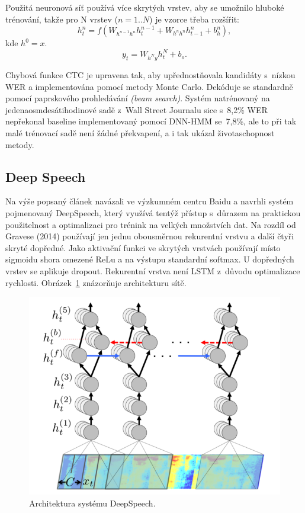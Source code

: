 Použitá neuronová síť používá více skrytých vrstev, aby se umožnilo hluboké
trénování, takže pro N vrstev ($n = 1 .. N$) je vzorce třeba rozšířit:
\begin{equation}
h_t^n = f(W_{h^{n-1}h^n}h_t^{n-1} + W_{h^{n}h^{n}}h_{t-1}^n + b_h^n),
\end{equation}
kde $h^0 = x$.
\begin{equation}
y_t = W_{h^{N}y}h_t^N + b_o.
\end{equation}

Chybová funkce CTC je upravena tak, aby upřednostňovala kandidáty s~nízkou WER a
implementována pomocí metody Monte Carlo. Dekóduje se standardně pomocí
paprskového prohledávání \textit{(beam search)}. Systém natrénovaný na
jedenaosmdesátihodinové sadě z~Wall Street Journalu sice s~8,2\% WER nepřekonal
baseline implementovaný pomocí DNN-HMM se~7,8\%, ale to při tak malé trénovací
sadě není žádné překvapení, a i tak ukázal životaschopnost metody.

\subsection{Deep Speech}
\label{ssec:deepspeechpaper}

Na výše popsaný článek navázali ve výzkumném centru Baidu a navrhli systém
pojmenovaný DeepSpeech\cite{hannun2014deep}, který využívá tentýž přístup
s~důrazem na praktickou použitelnost a optimalizaci pro trénink na velkých
množstvích dat. Na rozdíl od Gravese (2014) používají jen jednu obousměrnou
rekurentní vrstvu a další čtyři skryté dopředné. Jako aktivační funkci ve
skrytých vrstvách používají místo sigmoidu shora omezené ReLu a na výstupu
standardní softmax. U dopředných vrstev se aplikuje dropout. Rekurentní vrstva
není LSTM z~důvodu optimalizace rychlosti. Obrázek~\ref{fig:deepspeech-arch}
znázorňuje architekturu sítě.

\begin{figure}[htpb]
\includegraphics[scale=0.58]{rc/deepspeech-arch.png}
\caption{
    Architektura systému DeepSpeech.
}
\label{fig:deepspeech-arch}
\end{figure}

